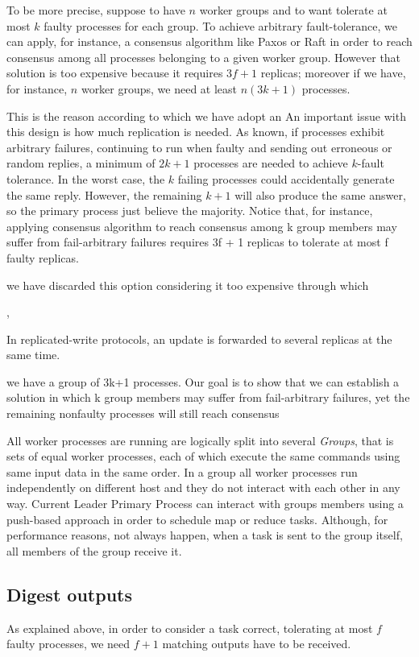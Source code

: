 \documentclass[sigchi]{acmart}
\begin{document}
To be more precise, suppose to have $n$ worker groups and to want tolerate at most $k$ faulty processes for each group. To achieve arbitrary fault-tolerance, we can apply, for instance, a consensus algorithm like Paxos or Raft in order to reach consensus among all processes belonging to a given worker group. However that solution is too expensive because it requires $3f + 1$ replicas; moreover if we have, for instance, $n$ worker groups, we need at least $n(3k + 1)$ processes.

This is the reason according to which we have adopt an 
An important issue with this design is how much replication is needed. As known, if processes exhibit arbitrary failures, continuing to run when faulty and sending out erroneous or random replies, a minimum of $2k+1$ processes are needed to achieve $k$-fault tolerance. In the worst case, the $k$ failing processes could accidentally generate the same reply. However, the remaining $k+1$ will also produce the same answer, so the primary process just believe the majority. Notice that, for instance, applying consensus algorithm to reach consensus among k group members may suffer from fail-arbitrary failures requires 3f + 1 replicas to tolerate at most f faulty replicas.

 we have discarded this option considering it too expensive through which

,

In replicated-write protocols, an update is forwarded to several replicas at the same time. 


  we have a group of 3k+1 processes. Our goal is to show that we can establish a solution in which k group members may suffer from fail-arbitrary failures, yet the remaining nonfaulty processes will still reach consensus


All worker processes are running are logically split into several \textit{Groups}, that is sets of equal worker processes, each of which execute the same commands using same input data in the same order. In a group all worker processes run independently on different host and they do not interact with each other in any way. Current Leader Primary Process can interact with groups members using a push-based approach in order to schedule map or reduce tasks. Although, for performance reasons, not always happen, when a task is sent to the group itself, all members of the group receive it.



\subsection{Digest outputs} As explained above, in order to consider a task correct, tolerating at most $f$ faulty processes, we need $f + 1$ matching outputs have to be received. 
\end{document}
